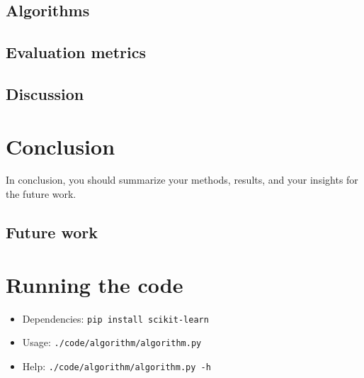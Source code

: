 \documentclass{article} %
\begin{document}
\subsection{Algorithms}

\subsection{Evaluation metrics}

\subsection{Discussion}

\section{Conclusion}
In conclusion, you should summarize your methods, results, and your insights for the future work.

\subsection{Future work}


\printbibliography\appendix

\section{Running the code}
\begin{itemize}
\item Dependencies: \texttt{pip install scikit-learn}
\item Usage: \texttt{./code/algorithm/algorithm.py}
\item Help: \texttt{./code/algorithm/algorithm.py -h}
\end{itemize}
\end{document}
